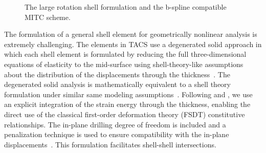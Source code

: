 \documentclass[12pt,headinclude,headsepline]{article}
\begin{document}
\begin{figure}[h]
  \centering
  \caption{The large rotation shell formulation and the b-spline
    compatible MITC scheme.}
  \label{fig:shell-figs}
\end{figure}

The formulation of a general shell element for geometrically nonlinear
analysis is extremely challenging. The elements in TACS use a
degenerated solid approach in which each shell element is formulated
by reducing the full three-dimensional equations of elasticity to the
mid-surface using shell-theory-like assumptions about the distribution
of the displacements through the thickness~\citep{Ahmad:1970:ATS,
  Bathe:1980:GMN, Parisch:1978:GNA, Hughes:1981:NFE}.  The degenerated
solid analysis is mathematically equivalent to a shell theory
formulation under similar same modeling
assumptions~\citep{Buechter:1992:STD}. Following
\citet{Milford:1986:DIF} and \citet{Buechter:1992:STD}, we use an
explicit integration of the strain energy through the thickness,
enabling the direct use of the classical first-order deformation
theory (FSDT) constitutive relationships. The in-plane drilling degree
of freedom is included and a penalization technique is used to ensure
compatibility with the in-plane displacements~\citep{Hughes:1989:DDF,
  Simo:1992:FFE, Fox:1992:DRF}. This formulation facilitates
shell-shell intersections.
\end{document}

